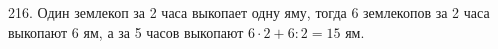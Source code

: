 216. Один землекоп за 2 часа выкопает одну яму, тогда 6 землекопов за 2 часа выкопают 6 ям, а за 5 часов выкопают $6\cdot2+6:2=15$ ям.\\
